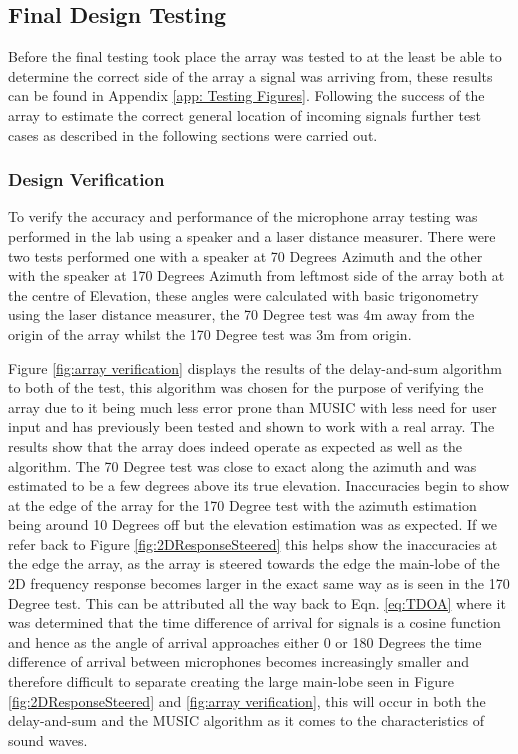\documentclass{UoNMCHA}
\numberwithin{equation}{section}
\begin{document}
\subsection{Final Design Testing} \label{sec:Second Array Testing}
    Before the final testing took place the array was tested to at the least be able to determine the correct side of the array a signal was arriving from, these results can be found in Appendix \ref{app: Testing Figures}. Following the success of the array to estimate the correct general location of incoming signals further test cases as described in the following sections were carried out.
\subsubsection{Design Verification} \label{sec:Design Verification Testing}
    To verify the accuracy and performance of the microphone array testing was performed in the lab using a speaker and a laser distance measurer. There were two tests performed one with a speaker at 70 Degrees Azimuth and the other with the speaker at 170 Degrees Azimuth from leftmost side of the array both at the centre of Elevation, these angles were calculated with basic trigonometry using the laser distance measurer, the 70 Degree test was 4m away from the origin of the array whilst the 170 Degree test was 3m from origin.

    Figure \ref{fig:array verification} displays the results of the delay-and-sum algorithm to both of the test, this algorithm was chosen for the purpose of verifying the array due to it being much less error prone than MUSIC with less need for user input and has previously been tested and shown to work with a real array. The results show that the array does indeed operate as expected as well as the algorithm. The 70 Degree test was close to exact along the azimuth and was estimated to be a few degrees above its true elevation. Inaccuracies begin to show at the edge of the array for the 170 Degree test with the azimuth estimation being around 10 Degrees off but the elevation estimation was as expected. If we refer back to Figure \ref{fig:2DResponseSteered} this helps show the inaccuracies at the edge the array, as the array is steered towards the edge the main-lobe of the 2D frequency response becomes larger in the exact same way as is seen in the 170 Degree test. This can be attributed all the way back to Eqn. \ref{eq:TDOA} where it was determined that the time difference of arrival for signals is a cosine function and hence as the angle of arrival approaches either 0 or 180 Degrees the time difference of arrival between microphones becomes increasingly smaller and therefore difficult to separate creating the large main-lobe seen in Figure \ref{fig:2DResponseSteered} and \ref{fig:array verification}, this will occur in both the delay-and-sum and the MUSIC algorithm as it comes to the characteristics of sound waves.
    
\end{document}
